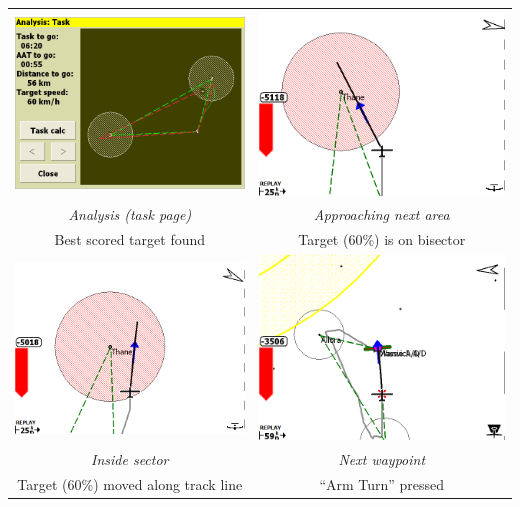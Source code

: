 \begin{maxipage}
\begin{center}
\begin{longtable}{|c|c|}
\toprule
\includegraphics[angle=0,width=0.45\linewidth,keepaspectratio='true']{figures/faat07.png} & 
\includegraphics[angle=0,width=0.45\linewidth,keepaspectratio='true']{figures/faat08.png} \\
\emph{Analysis (task page)} & \emph{Approaching next area} \\
Best scored target found & Target (60\%) is on bisector \\

\midrule
\includegraphics[angle=0,width=0.45\linewidth,keepaspectratio='true']{figures/faat09.png} & 
\includegraphics[angle=0,width=0.45\linewidth,keepaspectratio='true']{figures/faat11.png} \\
\emph{Inside sector} & \emph{Next waypoint} \\
Target (60\%) moved along track line & ``Arm Turn'' pressed \\


\end{longtable}
\end{center}
\end{maxipage}
